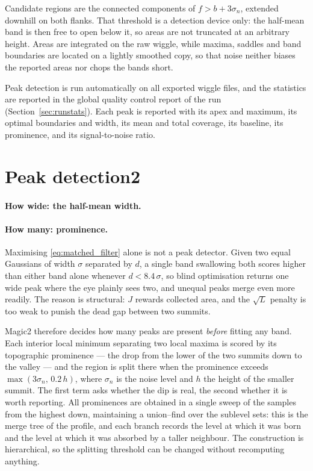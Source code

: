 \documentclass[11pt]{article}
\begin{document}
Candidate regions are the connected components of
$f > b + 3\sigma_n$, extended downhill on both flanks. That threshold is
a detection device only: the half-mean band is then free to open below
it, so areas are not truncated at an arbitrary height. Areas are
integrated on the raw wiggle, while maxima, saddles and band boundaries
are located on a lightly smoothed copy, so that noise neither biases the
reported areas nor chops the bands short.

Peak detection is run automatically on all exported wiggle files, and
the statistics are reported in the global quality control report of the
run (Section~\ref{sec:runstats}). Each peak is reported with its apex
and maximum, its optimal boundaries and width, its mean and total
coverage, its baseline, its prominence, and its signal-to-noise ratio.

\section{Peak detection2}
\label{sec:peak_detection2}


\paragraph{How wide: the half-mean width.}

\paragraph{How many: prominence.}
Maximising \eqref{eq:matched_filter} alone is not a peak detector. Given
two equal Gaussians of width $\sigma$ separated by $d$, a single band
swallowing both scores higher than either band alone whenever
$d < 8.4\,\sigma$, so blind optimisation returns one wide peak where the
eye plainly sees two, and unequal peaks merge even more readily. The
reason is structural: $J$ rewards collected area, and the $\sqrt{L}$
penalty is too weak to punish the dead gap between two summits.

Magic2 therefore decides how many peaks are present \emph{before}
fitting any band. Each interior local minimum separating two local
maxima is scored by its topographic prominence --- the drop from the
lower of the two summits down to the valley --- and the region is split
there when the prominence exceeds $\max(3\sigma_n,\,0.2\,h)$, where
$\sigma_n$ is the noise level and $h$ the height of the smaller summit.
The first term asks whether the dip is real, the second whether it is
worth reporting. All prominences are obtained in a single sweep of the
samples from the highest down, maintaining a union--find over the
sublevel sets: this is the merge tree of the profile, and each branch
records the level at which it was born and the level at which it was
absorbed by a taller neighbour. The construction is hierarchical, so the
splitting threshold can be changed without recomputing anything.
\end{document}
